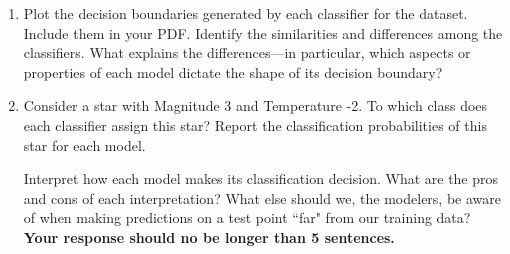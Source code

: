 \documentclass[submit]{harvardml}
\begin{document}
\begin{problem}
\begin{enumerate}
    \item Plot the decision boundaries generated by each classifier for the dataset. Include them in your PDF. 
    Identify the similarities and differences among the classifiers. What explains the differences---in particular, which aspects or properties of each model dictate the shape of its decision boundary? 
    
    \item 
    
    Consider a star with Magnitude 3 and Temperature -2. To which class does each classifier assign this star? Report the classification probabilities of this star for each model. 
    
    Interpret how each model makes its classification decision. What are the pros and cons of each interpretation? What else should we, the modelers, be aware of when making predictions on a test point ``far" from our training data? \textbf{Your response should no be longer than 5 sentences.}
\end{enumerate}
\end{problem}

\end{document}
